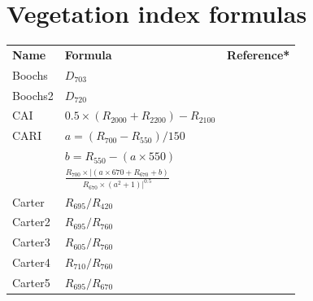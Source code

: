 \documentclass[journal]{IEEEtran}
\begin{document}
\section{Vegetation index formulas}

\begingroup\scriptsize
\setlength\tabcolsep{4pt}  %
\begin{xtabular*}{0.3\textwidth}{lll}
	\bfseries{Name} & \bfseries{Formula}                                                                                  & \bfseries{Reference*}      \\
	Boochs          & $D_{703}$                                                                                           & \cite{boochs1990}       \\
	Boochs2         & $D_{720}$                                                                                           & \cite{boochs1990}       \\
	CAI             & $0.5 \times (R_{2000} + R_{2200}) -R_{2100}$                                                        & \cite{nagler2003}       \\
	\midrule
	CARI            & $a = (R_{700}-R_{550}) / 150$                                                                       & \cite{walthall1994}          \\
	& $b = R_{550}-(a\times 550)$                                                                                         &                                  \\
	& $\frac{R_{700}\times | (a\times 670+R_{670}+b)}{R_{670}\times(a^2+1)| ^{0.5}}$                                      &                                  \\
	\midrule
	Carter          & $R_{695}/R_{420}$                                                                                   & \cite{carter1994}              \\
	Carter2         & $R_{695}/R_{760}$                                                                                   & \cite{carter1994}              \\
	Carter3         & $R_{605}/R_{760}$                                                                                   & \cite{carter1994}              \\
	Carter4         & $R_{710}/R_{760}$                                                                                   & \cite{carter1994}              \\
	Carter5         & $R_{695}/R_{670}$                                                                                   & \cite{carter1994}              \\

\end{xtabular*}
\end{document}
